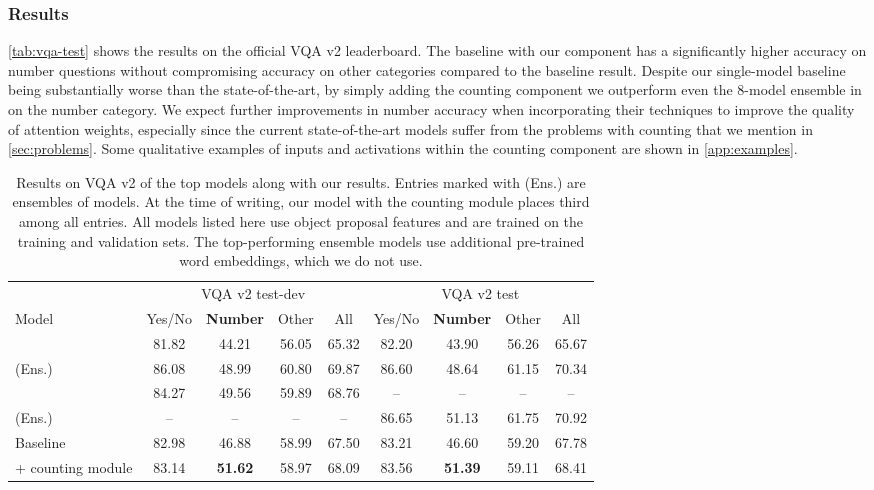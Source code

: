 \documentclass[letterpaper]{article}
\begin{document}
\subsubsection{Results}
\autoref{tab:vqa-test} shows the results on the official VQA v2 leaderboard.
The baseline with our component has a significantly higher accuracy on number questions without compromising accuracy on other categories compared to the baseline result.
Despite our single-model baseline being substantially worse than the state-of-the-art, by simply adding the counting component we outperform even the 8-model ensemble in \citet{Zhou2017a} on the number category.
We expect further improvements in number accuracy when incorporating their techniques to improve the quality of attention weights, especially since the current state-of-the-art models suffer from the problems with counting that we mention in \autoref{sec:problems}.
Some qualitative examples of inputs and activations within the counting component are shown in \autoref{app:examples}.

\setlength\tabcolsep{3.8pt}
\begin{table}
    \caption{
        Results on VQA v2 of the top models along with our results.
        Entries marked with (Ens.) are ensembles of models.
        At the time of writing, our model with the counting module places third among all entries.
        All models listed here use object proposal features and are trained on the training and validation sets.
        The top-performing ensemble models use additional pre-trained word embeddings, which we do not use.
    }
    \label{tab:vqa-test}
    \centering
    \begin{tabular}{l c c c c c c c c}
        \\
        \toprule
        & \multicolumn{4}{c}{VQA v2 test-dev} & \multicolumn{4}{c}{VQA v2 test}\\
        \cmidrule(l{4pt}){2-5} \cmidrule(l{4pt}){6-9}
        Model & Yes/No & \textbf{Number} & Other & All & Yes/No & \textbf{Number} & Other & All \\
        \hline
        \citet{Teney2017a} & 81.82 & 44.21 & 56.05 & 65.32 & 82.20 & 43.90 & 56.26 & 65.67 \\
        \citet{Teney2017a} (Ens.)& 86.08 & 48.99 & 60.80 & 69.87 & 86.60 & 48.64 & 61.15 & 70.34 \\
        \citet{Zhou2017a} & 84.27 & 49.56 & 59.89 & 68.76 & -- & -- & -- & -- \\
        \citet{Zhou2017a} (Ens.) & -- & -- & -- & -- & 86.65 & 51.13 & 61.75 & 70.92 \\
        \hline
        Baseline & 82.98 & 46.88 & 58.99 & 67.50 & 83.21 & 46.60 & 59.20 & 67.78 \\
        + counting module & 83.14 & \textbf{51.62} & 58.97 & 68.09 & 83.56 & \textbf{51.39} & 59.11 & 68.41 \\
        \bottomrule
    \end{tabular}
\end{table}
\end{document}
